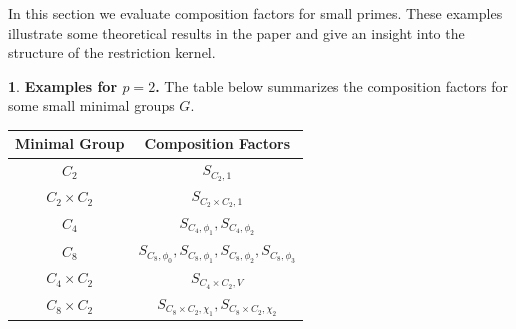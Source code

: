 \documentclass[12pt]{article}
\theoremstyle{plain}
\theoremstyle{definition}
\newtheorem{nothing}[theorem]{}
\begin{document}
In this section we evaluate composition factors for small primes. These examples illustrate some theoretical results in the paper and give an insight into the structure of the restriction kernel.

\begin{nothing}{\bf Examples for \(p = 2\).} 
The table below summarizes the composition factors for some small minimal groups \(G\).
\end{nothing}

\begin{table}[h!]
\centering
\begin{tabular}{|c|c|}
\hline
\textbf{Minimal Group} & \textbf{Composition Factors} \\
\hline
\(C_2\) & \(S_{C_2, 1}\) \\
\(C_2 \times C_2\) & \(S_{C_2 \times C_2, 1}\) \\
\(C_4\) & \(S_{C_4, \phi_1}, S_{C_4, \phi_2}\) \\
$C_8$ & $S_{C_8, \phi_0}, S_{C_8, \phi_1}, S_{C_8, \phi_2}, S_{C_8, \phi_3}$ \\
$C_4\times C_2$ & $S_{C_4\times C_2, V}$\\
$C_8\times C_2$ & $S_{C_8\times C_2, \chi_1}, S_{C_8\times C_2, \chi_2}$\\
\hline
\end{tabular}
\end{table}
\end{document}

